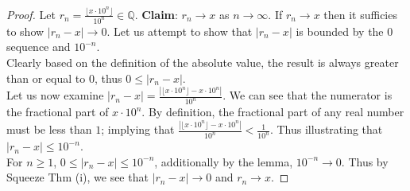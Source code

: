 \documentclass[ 12pt ]{article}
\begin{document}
\begin{enumerate}
	\begin{proof}
		Let $r_n = \frac{\lfloor x \cdot 10^n \rfloor}{10^n} \in \mathbb{Q}$.
		\textbf{Claim}: $r_n \rightarrow x$ as $n \rightarrow \infty$. If
		$r_n \rightarrow x$ then it sufficies to show
		$|r_n - x| \rightarrow 0$. Let us attempt to show that $|r_n - x|$ is
		bounded by the $0$ sequence and $10^{-n}$. \\
		Clearly based on the
		definition of the absolute value, the result is always greater than or
		equal to $0$, thus $0 \leq |r_n - x|$. \\
		Let us now examine
		$|r_n - x| = \frac{\left | \lfloor x \cdot 10^n \rfloor - x \cdot 10^n  \right |}{10^n}$.
		We can see that the numerator is the fractional part of $x \cdot 10^n$.
		By definition, the fractional part of any real number must be less than
		$1$; implying that $\frac{\left | \lfloor x \cdot 10^n \rfloor - x \cdot 10^n  \right |}{10^n} < \frac{1}{10^n}$.
		Thus illustrating that $|r_n - x| \leq 10^{-n}$. \\
		For $n \geq 1$, $0 \leq |r_n - x| \leq 10^{-n}$, additionally by the
		lemma, $10^{-n} \rightarrow 0$. Thus by Squeeze Thm (i), we see that
		$|r_n - x| \rightarrow 0$ and $r_n \rightarrow x$.
	\end{proof}
\end{enumerate}
\end{document}
